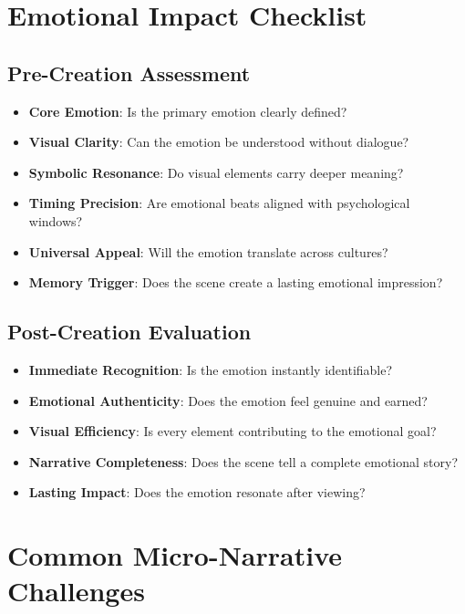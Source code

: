 \section*{Emotional Impact Checklist}

\subsection*{Pre-Creation Assessment}
\begin{itemize}
\item[$\square$] \textbf{Core Emotion}: Is the primary emotion clearly defined?
\item[$\square$] \textbf{Visual Clarity}: Can the emotion be understood without dialogue?
\item[$\square$] \textbf{Symbolic Resonance}: Do visual elements carry deeper meaning?
\item[$\square$] \textbf{Timing Precision}: Are emotional beats aligned with psychological windows?
\item[$\square$] \textbf{Universal Appeal}: Will the emotion translate across cultures?
\item[$\square$] \textbf{Memory Trigger}: Does the scene create a lasting emotional impression?
\end{itemize}

\subsection*{Post-Creation Evaluation}
\begin{itemize}
\item[$\square$] \textbf{Immediate Recognition}: Is the emotion instantly identifiable?
\item[$\square$] \textbf{Emotional Authenticity}: Does the emotion feel genuine and earned?
\item[$\square$] \textbf{Visual Efficiency}: Is every element contributing to the emotional goal?
\item[$\square$] \textbf{Narrative Completeness}: Does the scene tell a complete emotional story?
\item[$\square$] \textbf{Lasting Impact}: Does the emotion resonate after viewing?
\end{itemize}

\section*{Common Micro-Narrative Challenges}

